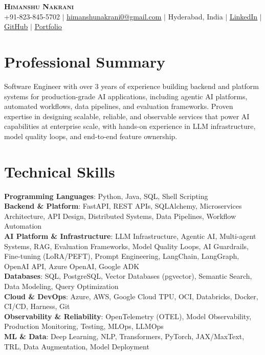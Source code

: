 \documentclass[letterpaper,11pt]{article}
\begin{document}
    \begin{center}
        \textbf{\Huge \scshape Himanshu Nakrani} \\ \vspace{1pt}
        \small +91-823-845-5702 $|$ \href{mailto:himanshunakrani0@gmail.com}{\underline{himanshunakrani0@gmail.com}} $|$
        Hyderabad, India $|$
        \href{https://www.linkedin.com/in/himanshu-nakrani/}{\underline{LinkedIn}} $|$
        \href{https://github.com/himanshu-nakrani}{\underline{GitHub}} $|$
        \href{https://www.himanshunakrani.me}{\underline{Portfolio}}
    \end{center}
    \section{Professional Summary}
    \small{Software Engineer with over 3 years of experience building backend and platform systems for production-grade AI applications, including agentic AI platforms, automated workflows, data pipelines, and evaluation frameworks. Proven expertise in designing scalable, reliable, and observable services that power AI capabilities at enterprise scale, with hands-on experience in LLM infrastructure, model quality loops, and end-to-end feature ownership.}
    \section{Technical Skills}
    \begin{itemize}[leftmargin=0.15in, label={}]
        \small{\item{
        \textbf{Programming Languages}{: Python, Java, SQL, Shell Scripting} \\
        \textbf{Backend \& Platform}{: FastAPI, REST APIs, SQLAlchemy, Microservices Architecture, API Design, Distributed Systems, Data Pipelines, Workflow Automation} \\
        \textbf{AI Platform \& Infrastructure}{: LLM Infrastructure, Agentic AI, Multi-agent Systems, RAG, Evaluation Frameworks, Model Quality Loops, AI Guardrails, Fine-tuning (LoRA/PEFT), Prompt Engineering, LangChain, LangGraph, OpenAI API, Azure OpenAI, Google ADK} \\
        \textbf{Databases}{: SQL, PostgreSQL, Vector Databases (pgvector), Semantic Search, Data Modeling, Query Optimization} \\
        \textbf{Cloud \& DevOps}{: Azure, AWS, Google Cloud TPU, OCI, Databricks, Docker, CI/CD, Harness, Git} \\
        \textbf{Observability \& Reliability}{: OpenTelemetry (OTEL), Model Observability, Production Monitoring, Testing, MLOps, LLMOps} \\
        \textbf{ML \& Data}{: Deep Learning, NLP, Transformers, PyTorch, JAX/MaxText, TRL, Data Augmentation, Model Deployment} \\
        }}
    \end{itemize}
\end{document}
